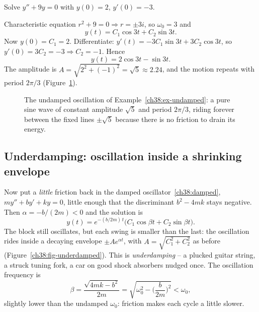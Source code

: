 \begin{example}
\label{ch38:ex-undamped}
Solve $y'' + 9y = 0$ with $y(0) = 2$, $y'(0) = -3$.

Characteristic equation $r^2 + 9 = 0 \Rightarrow r = \pm 3i$, so $\omega_0 = 3$
and
\[
  y(t) = C_1 \cos 3t + C_2 \sin 3t.
\]
Now $y(0) = C_1 = 2$. Differentiate: $y'(t) = -3C_1 \sin 3t + 3 C_2 \cos 3t$, so
$y'(0) = 3 C_2 = -3 \Rightarrow C_2 = -1$. Hence
\[
  y(t) = 2\cos 3t - \sin 3t.
\]
The amplitude is $A = \sqrt{2^2 + (-1)^2} = \sqrt 5 \approx 2.24$, and the motion
repeats with period $2\pi/3$ (Figure~\ref{ch38:fig-undamped}).
\end{example}

\begin{figure}[htbp]
\centering
{}
\caption{The undamped oscillation of Example~\ref{ch38:ex-undamped}: a pure sine
wave of constant amplitude $\sqrt5$ and period $2\pi/3$, riding forever between
the fixed lines $\pm\sqrt5$ because there is no friction to drain its energy.}
\label{ch38:fig-undamped}
\end{figure}

\subsection*{Underdamping: oscillation inside a shrinking envelope}

Now put a \emph{little} friction back in the damped oscillator~\eqref{ch38:damped},
$m y'' + b y' + k y = 0$, little enough that the discriminant $b^2 - 4mk$ stays
negative. Then
$\alpha = -b/(2m) < 0$ and the solution is
\[
  y(t) = e^{-(b/2m)\,t}\big(C_1 \cos\beta t + C_2 \sin\beta t\big).
\]
The block still oscillates, but each swing is smaller than the last: the
oscillation rides inside a decaying envelope $\pm A e^{\alpha t}$, with
$A = \sqrt{C_1^2 + C_2^2}$ as before (Figure~\ref{ch38:fig-underdamped}). This is
\emph{underdamping} -- a plucked guitar string, a struck tuning fork, a car on
good shock absorbers nudged once. The oscillation frequency is
\[
  \beta = \frac{\sqrt{4mk - b^2}}{2m} = \sqrt{\omega_0^2 - \Big(\frac{b}{2m}\Big)^2} < \omega_0,
\]
slightly lower than the undamped $\omega_0$: friction makes each cycle a little
slower.

